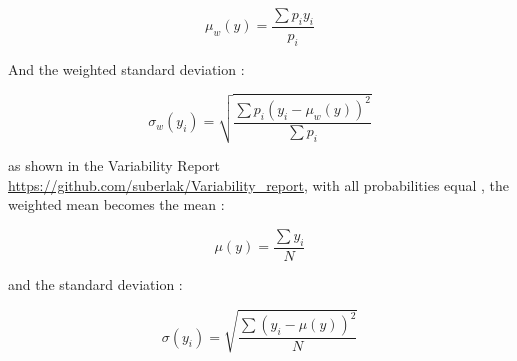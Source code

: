 \documentclass[fleqn,usenatbib]{mnras}  %
\begin{document}
\begin{equation}
\mu_{w}(y) = \frac{\sum{p_{i}y_{i}}}{p_{i}}
\end{equation}

And the weighted standard deviation : 

\begin{equation}
\sigma_{w}(y_{i}) = \sqrt{\frac{\sum{p_{i} (y_{i} - \mu_{w}(y))^{2}}}{\sum{p_{i}}}}
\end{equation}

as shown in the Variability Report \url{https://github.com/suberlak/Variability_report}, with all probabilities equal , the weighted mean becomes the mean : 

\begin{equation}
\mu(y) = \frac{\sum{y_{i}}}{N}
\end{equation}

and  the standard deviation : 

\begin{equation}
\sigma(y_{i}) = \sqrt{\frac{\sum (y_{i} - \mu(y))^{2}}{N}}
\end{equation}




%

















\bsp	%
\label{lastpage}
\end{document}
